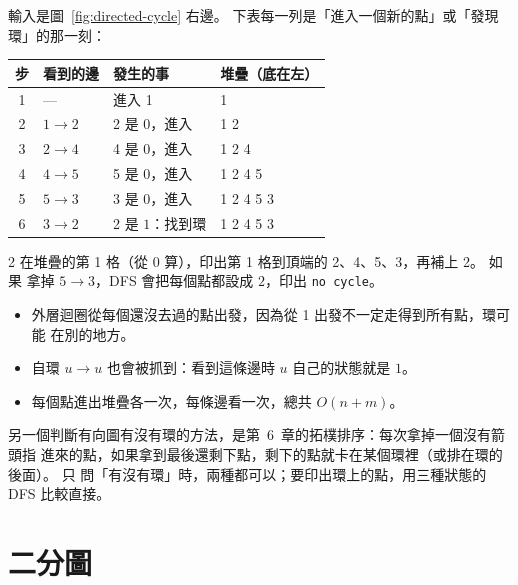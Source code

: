 
輸入是圖~\ref{fig:directed-cycle} 右邊。 下表每一列是「進入一個新的點」或「發現
環」的那一刻：

\begin{center}
\begin{tabular}{clll}
\toprule
步 & 看到的邊 & 發生的事 & 堆疊（底在左） \\
\midrule
1 & --- & 進入 1 & 1 \\
2 & $1 \to 2$ & 2 是 $0$，進入 & 1 2 \\
3 & $2 \to 4$ & 4 是 $0$，進入 & 1 2 4 \\
4 & $4 \to 5$ & 5 是 $0$，進入 & 1 2 4 5 \\
5 & $5 \to 3$ & 3 是 $0$，進入 & 1 2 4 5 3 \\
6 & $3 \to 2$ & 2 是 $1$：找到環 & 1 2 4 5 3 \\
\bottomrule
\end{tabular}
\end{center}

2 在堆疊的第 1 格（從 $0$ 算），印出第 1 格到頂端的 2、4、5、3，再補上 2。 如果
拿掉 $5 \to 3$，DFS 會把每個點都設成 $2$，印出 \texttt{no cycle}。

\begin{itemize}
\item 外層迴圈從每個還沒去過的點出發，因為從 1 出發不一定走得到所有點，環可能
在別的地方。
\item 自環 $u \to u$ 也會被抓到：看到這條邊時 $u$ 自己的狀態就是 $1$。
\item 每個點進出堆疊各一次，每條邊看一次，總共 $O(n + m)$。
\end{itemize}

另一個判斷有向圖有沒有環的方法，是第~6~章的拓樸排序：每次拿掉一個沒有箭頭指
進來的點，如果拿到最後還剩下點，剩下的點就卡在某個環裡（或排在環的後面）。 只
問「有沒有環」時，兩種都可以；要印出環上的點，用三種狀態的 DFS 比較直接。

\section{二分圖}
\label{sec:bipartite}

